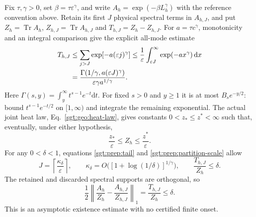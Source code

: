 \documentclass[aps,pra,reprint,superscriptaddress,longbibliography]{revtex4-2}
\newcommand{\Tr}{\operatorname{Tr}}
\newcommand{\dd}{\mathrm d}
\begin{document}
Fix $\tau,\gamma>0$, set $\beta=\tau\varepsilon^\gamma$, and write
$A_h=\exp(-\beta L_h^\gamma)$ with the reference convention above.
Retain its first $J$ physical spectral terms in $A_{h,J}$, and put
$Z_h=\Tr A_h$, $Z_{h,J}=\Tr A_{h,J}$ and
$T_{h,J}=Z_h-Z_{h,J}$. For $a=\tau c^\gamma$, monotonicity and an
integral comparison give the explicit all-mode estimate
\begin{align}
 T_{h,J}
 &\le\sum_{j>J}\exp[-a(\varepsilon j)^\gamma]
 \le\frac1\varepsilon\int_{\varepsilon J}^\infty
                   \exp(-a x^\gamma)\,\dd x\notag\\
 &=\frac{\Gamma(1/\gamma,a(\varepsilon J)^\gamma)}
          {\varepsilon\gamma a^{1/\gamma}}.
 \label{sgt:prep:tail}
\end{align}
Here $\Gamma(s,y)=\int_y^\infty t^{s-1}e^{-t}\dd t$.
For fixed $s>0$ and $y\ge1$ it is at most $B_s e^{-y/2}$:
bound $t^{s-1}e^{-t/2}$ on $[1,\infty)$ and integrate the remaining
exponential. The actual joint heat law, Eq.~\eqref{sgt:geo:heat-law}, gives constants
$0<z_*\le z^*<\infty$ such that, eventually, under either hypothesis,
\begin{equation}
 \frac{z_*}{\varepsilon}\le Z_h\le\frac{z^*}{\varepsilon}.
 \label{sgt:prep:partition-scale}
\end{equation}
For any $0<\delta<1$, equations \eqref{sgt:prep:tail} and
\eqref{sgt:prep:partition-scale} allow
\begin{equation}
 J=\left\lceil\frac{\kappa_\delta}{\varepsilon}\right\rceil,
 \qquad
 \kappa_\delta=O\bigl([1+\log(1/\delta)]^{1/\gamma}\bigr),
 \qquad \frac{T_{h,J}}{Z_h}\le\delta.
 \label{sgt:prep:cutoff}
\end{equation}
The retained and discarded spectral supports are orthogonal, so
\begin{equation}
 \frac12\left\|\frac{A_h}{Z_h}
                  -\frac{A_{h,J}}{Z_{h,J}}\right\|_1
 =\frac{T_{h,J}}{Z_h}\le\delta.
 \label{sgt:prep:trace-distance}
\end{equation}
This is an asymptotic existence estimate with no certified finite onset.
\end{document}
